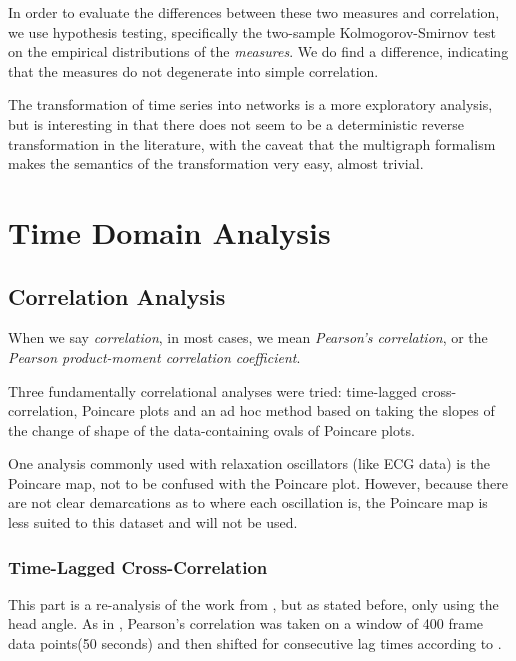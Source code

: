 \documentclass[12pt]{article}
\begin{document}
In order to evaluate the differences between these two measures and correlation, we use hypothesis testing, specifically the two-sample Kolmogorov-Smirnov test\cite{ks} on the empirical distributions of the \emph{measures}. We do find a difference, indicating that the measures do not degenerate into simple correlation.

The transformation of time series into networks is a more exploratory analysis, but is interesting in that there does not seem to be a deterministic reverse transformation in the literature, with the caveat that the multigraph formalism makes the semantics of the transformation very easy, almost trivial.

\section{Time Domain Analysis}

\subsection{Correlation Analysis}

When we say \emph{correlation}, in most cases, we mean \emph{Pearson's correlation}, or the \emph{Pearson product-moment correlation coefficient}.

Three fundamentally correlational analyses were tried: time-lagged cross-correlation, Poincare plots and an ad hoc method based on taking the slopes of the change of shape of the data-containing ovals of Poincare plots.

One analysis commonly used with relaxation oscillators (like ECG data) is the Poincare map, not to be confused with the Poincare plot. However, because there are not clear demarcations as to where each oscillation is, the Poincare map is less suited to this dataset and will not be used\cite{physsync}.

\subsubsection{Time-Lagged Cross-Correlation}

This part is a re-analysis of the work from \cite{andrea}, but as stated before, only using the head angle. As in \cite{andrea}, Pearson's correlation was taken on a window of 400 frame data points(50 seconds) and then shifted for consecutive lag times according to \cite{framedifferencing}.
\end{document}
